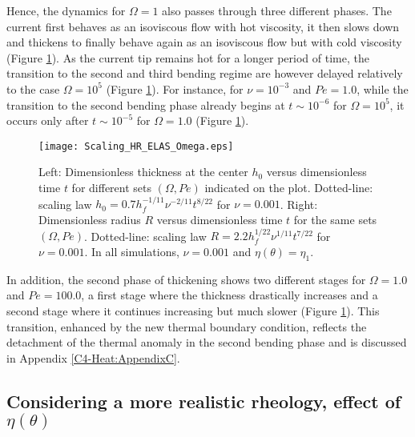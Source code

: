 Hence, the dynamics for $\Omega=1$ also passes through three different
phases.   The current  first behaves  as an  isoviscous flow  with hot
viscosity, it then slows down and  thickens to finally behave again as
an    isoviscous    flow    but   with    cold    viscosity    (Figure
\ref{C4-Scaling_HR_ELAS_Omega}).  As the current tip remains hot for a
longer period of time, the transition  to the second and third bending
regime  are however  delayed  relatively to  the  case $\Omega=  10^5$
(Figure    \ref{C4-Scaling_HR_ELAS_Omega}).     For   instance,    for
$\nu=10^{-3}$ and $Pe=1.0$, while the transition to the second bending
phase already begins at $t\sim 10^{-6}$ for $\Omega=10^{5}$, it occurs
only    after   $t\sim    10^{-5}$   for    $\Omega=   1.0$    (Figure
\ref{C4-Scaling_HR_ELAS_Omega}).

\begin{figure}[h!]
  \begin{center}
    \graphicspath{ {/Users/thorey/Documents/These/Projet/Refroidissement/Skin_Model/Figure/Figure_Heating/} }
    \texttt{[image: Scaling\_HR\_ELAS\_Omega.eps]}
    \caption{Left: Dimensionless thickness at  the center $h_0$ versus
      dimensionless   time  $t$   for  different   sets  $(\Omega,Pe)$
      indicated    on   the    plot.     Dotted-line:   scaling    law
      $h_0=   0.7h_f^{-1/11}\nu^{-2/11}t^{8/22}$    for   $\nu=0.001$.
      Right: Dimensionless  radius $R$  versus dimensionless  time $t$
      for  the  same  sets $(\Omega,Pe)$.   Dotted-line:  scaling  law
      $R= 2.2h_f^{1/22}\nu^{1/11}t^{7/22}$ for $\nu  = 0.001$.  In all
      simulations, $\nu=0.001$ and $\eta(\theta)=\eta_1$.}
    \label{C4-Scaling_HR_ELAS_Omega}
  \end{center}
\end{figure}

In addition, the second phase of thickening shows two different stages
for $\Omega =  1.0$ and $Pe=100.0$, a first stage  where the thickness
drastically increases and a second stage where it continues increasing
but   much  slower   (Figure  \ref{C4-Scaling_HR_ELAS_Omega}).    This
transition, enhanced  by the new thermal  boundary condition, reflects
the detachment of the thermal anomaly  in the second bending phase and
is discussed in Appendix \ref{C4-Heat:AppendixC}.

\subsection{Considering   a  more   realistic   rheology,  effect   of
  $\eta(\theta)$}
\label{C4-sec:infl-therm-bound-el}


